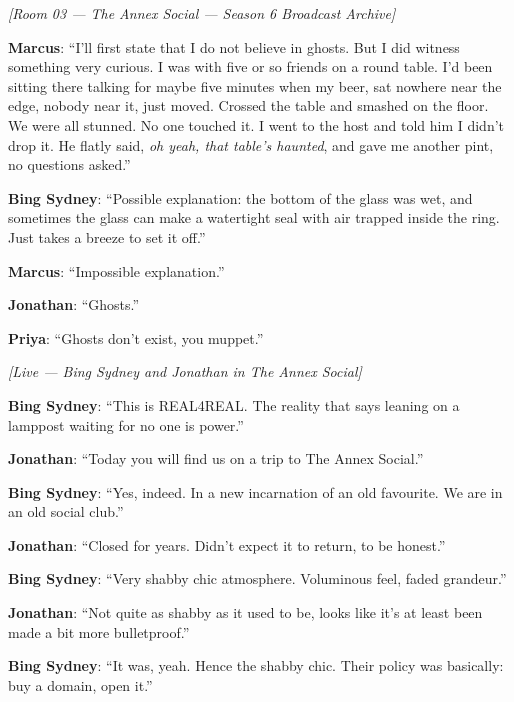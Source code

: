 \medskip
\begin{center}
{\small\sffamily\color{nullmesh-ghost}\textit{[Room 03 --- The Annex Social --- Season 6 Broadcast Archive]}}
\end{center}
\medskip

\noindent\textbf{Marcus}: ``I'll first state that I do not believe in ghosts. But I did witness something very curious. I was with five or so friends on a round table. I'd been sitting there talking for maybe five minutes when my beer, sat nowhere near the edge, nobody near it, just moved. Crossed the table and smashed on the floor. We were all stunned. No one touched it. I went to the host and told him I didn't drop it. He flatly said, \textit{oh yeah, that table's haunted}, and gave me another pint, no questions asked.''

\noindent\textbf{Bing Sydney}: ``Possible explanation: the bottom of the glass was wet, and sometimes the glass can make a watertight seal with air trapped inside the ring. Just takes a breeze to set it off.''

\noindent\textbf{Marcus}: ``Impossible explanation.''

\noindent\textbf{Jonathan}: ``Ghosts.''

\noindent\textbf{Priya}: ``Ghosts don't exist, you muppet.''

\medskip
\begin{center}
{\small\sffamily\color{nullmesh-ghost}\textit{[Live --- Bing Sydney and Jonathan in The Annex Social]}}
\end{center}
\medskip

\noindent\textbf{Bing Sydney}: ``This is REAL4REAL. The reality that says leaning on a lamppost waiting for no one is power.''

\noindent\textbf{Jonathan}: ``Today you will find us on a trip to The Annex Social.''

\noindent\textbf{Bing Sydney}: ``Yes, indeed. In a new incarnation of an old favourite. We are in an old social club.''

\noindent\textbf{Jonathan}: ``Closed for years. Didn't expect it to return, to be honest.''

\noindent\textbf{Bing Sydney}: ``Very shabby chic atmosphere. Voluminous feel, faded grandeur.''

\noindent\textbf{Jonathan}: ``Not quite as shabby as it used to be, looks like it's at least been made a bit more bulletproof.''

\noindent\textbf{Bing Sydney}: ``It was, yeah. Hence the shabby chic. Their policy was basically: buy a domain, open it.''

